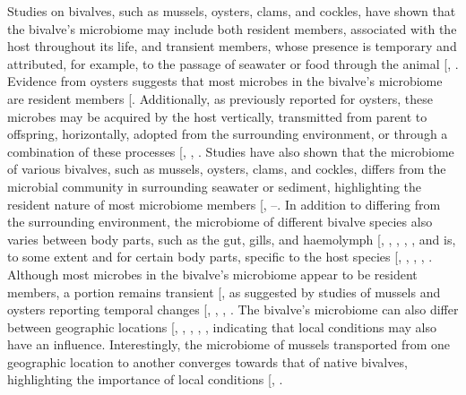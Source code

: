 \documentclass[
  12 pt,
]{article}
\begin{document}
Studies on bivalves, such as mussels, oysters, clams, and cockles, have shown that the bivalve's microbiome may include both resident members, associated with the host throughout its life, and transient members, whose presence is temporary and attributed, for example, to the passage of seawater or food through the animal {[}, \citeproc{ref-Pierce2018}{7}{]}. Evidence from oysters suggests that most microbes in the bivalve's microbiome are resident members {[}\citeproc{ref-Unzueta-Martinez2022a}{8}{]}. Additionally, as previously reported for oysters, these microbes may be acquired by the host vertically, transmitted from parent to offspring, horizontally, adopted from the surrounding environment, or through a combination of these processes {[}, , \citeproc{ref-Unzueta-Martinez2022}{10}{]}. Studies have also shown that the microbiome of various bivalves, such as mussels, oysters, clams, and cockles, differs from the microbial community in surrounding seawater or sediment, highlighting the resident nature of most microbiome members {[}, --\citeproc{ref-Vezzulli2018}{16}{]}. In addition to differing from the surrounding environment, the microbiome of different bivalve species also varies between body parts, such as the gut, gills, and haemolymph {[}, , , , \citeproc{ref-Dube2019}{17}{]}, and is, to some extent and for certain body parts, specific to the host species {[}, , , , \citeproc{ref-Gignoux-Wolfsohn2024}{18}{]}. Although most microbes in the bivalve's microbiome appear to be resident members, a portion remains transient {[}\citeproc{ref-Unzueta-Martinez2022a}{8}{]}, as suggested by studies of mussels and oysters reporting temporal changes {[}, , , \citeproc{ref-Pierce2016}{20}{]}. The bivalve's microbiome can also differ between geographic locations {[}, , , , \citeproc{ref-Lokmer2016a}{22}{]}, indicating that local conditions may also have an influence. Interestingly, the microbiome of mussels transported from one geographic location to another converges towards that of native bivalves, highlighting the importance of local conditions {[}, \citeproc{ref-Sun2025}{24}{]}.
\end{document}
